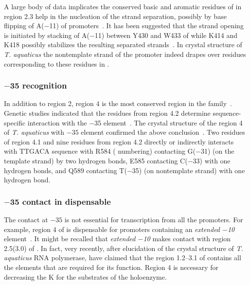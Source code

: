 A large body of data implicates the conserved basic and aromatic
residues of \s{} in region 2.3 help in the nucleation of the
strand separation, possibly by base flipping  of A($-$11) of
promoters~\citep{Helmann1999,Panaghie2000,Fenton2000,Tomsic2001}.
It has been suggested that the strand opening is initiated by
stacking of A($-$11) between Y430 and W433 of  \siga{}
while K414 and K418 possibly stabilizes the resulting separated
strands~\citep{Tomsic2001,Tsu2002}. In crystal structure of
\emph{T. aquaticus} the nontemplate strand of the promoter indeed
drapes over residues corresponding to these residues in .

\subsubsection{$-$35 recognition}

In addition to region 2, region 4 is the most conserved region in
the \siga{} family~\citep{Lonetto1992}. Genetic studies indicated
that the residues from region 4.2 determine sequence-specific
interaction with the $-$35
element~\citep{Gradella1989,Kenney1991,Siegele1989}. The crystal
structure of the region 4 of \emph{T. aquaticus} \s{} with $-35$
element confirmed the above conclusion~\citep{Campbell2002}. Two
residues of region 4.1 and nine residues from region 4.2 directly
or indirectly interacts with T\-T\-G\-A\-C\-A
sequence with R584 ( numbering) contacting G($-$31) (on
the template strand) by two hydrogen bonds, E585 contacting
C($-$33) with one hydrogen bonds, and Q589 contacting T($-$35) (on
nontemplate strand) with one hydrogen bond.

 \subsubsection{$-$35 contact in dispensable}

The contact at $-35$ is not essential for transcription from all
the promoters. For example, region 4 of \siga{} is dispensable for
promoters containing an \emph{extended $-$10}
element~\citep[\textbf{TG}nTATAAT;
][]{Barne1997,Keilty1987,Kumar1993,Campbell2002}. It might be
recalled that \emph{extended $-$10} makes contact with region
2.5(3.0) of \s{}\@. In fact, very recently, after elucidation of
the crystal structure of \emph{T. aquaticus} RNA polymerase,
\citet{Campbell2002} have claimed that the region 1.2--3.1 of \s{}
contains all the elements that are required for its function.
Region 4 is necessary for decreasing the K for the
substrates of the holoenzyme.

